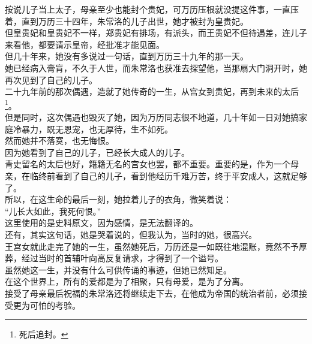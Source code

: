 \begin{multicols}{\theparacolNo}
按说儿子当上太子，母亲至少也能封个贵妃，可万历压根就没提这件事，一直压着，直到万历三十四年，朱常洛的儿子出世，她才被封为皇贵妃。\\

但皇贵妃和皇贵妃不一样，郑贵妃有排场，有派头，而王贵妃不但待遇差，连儿子来看他，都要请示皇帝，经批准才能见面。\\

但几十年来，她没有多说过一句话，直到万历三十九年的那一天。\\

她已经病入膏肓，不久于人世，而朱常洛也获准去探望他，当那扇大门洞开时，她再次见到了自己的儿子。\\

二十九年前的那次偶遇，造就了她传奇的一生，从宫女到贵妃，再到未来的太后\footnote{死后追封。}。\\

但是同时，这次偶遇也毁灭了她，因为万历同志很不地道，几十年如一日对她搞家庭冷暴力，既无恩宠，也无厚待，生不如死。\\

然而她并不落寞，也无悔恨。\\

因为她看到了自己的儿子，已经长大成人的儿子。\\

青史留名的太后也好，籍籍无名的宫女也罢，都不重要。重要的是，作为一个母亲，在临终前看到了自己的儿子，看到他经历千难万苦，终于平安成人，这就足够了。\\

所以，在这生命的最后一刻，她拉着儿子的衣角，微笑着说：\\

“儿长大如此，我死何恨。”\\

这里使用的是史料原文，因为感情，是无法翻译的。\\

还有，其实这句话，她是哭着说的，但我认为，当时的她，很高兴。\\

王宫女就此走完了她的一生，虽然她死后，万历还是一如既往地混账，竟然不予厚葬，经过当时的首辅叶向高反复请求，才得到了一个谥号。\\

虽然她这一生，并没有什么可供传诵的事迹，但她已然知足。\\

在这个世界上，所有的爱都是为了相聚，只有母爱，是为了分离。\\

接受了母亲最后祝福的朱常洛还将继续走下去，在他成为帝国的统治者前，必须接受更为可怕的考验。\\


\end{multicols}
